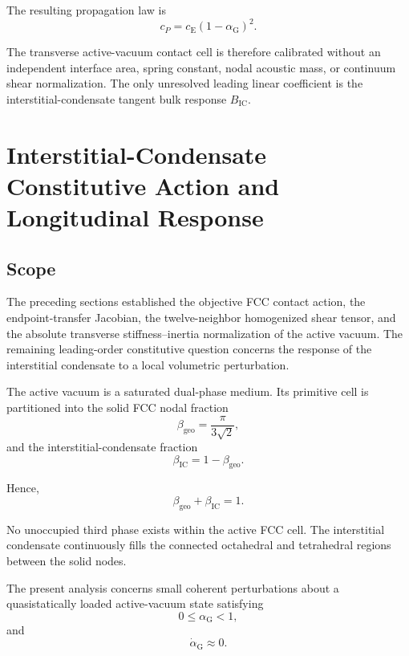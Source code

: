 The resulting propagation law is
\begin{equation}
    \boxed{ c_P = c_{\mathrm{E}} \left( 1-\alpha_{\mathrm{G}} \right)^2 }.
\end{equation}

The transverse active-vacuum contact cell is therefore calibrated without an independent interface area, spring constant, nodal acoustic mass, or continuum shear normalization. The only unresolved leading linear coefficient is the interstitial-condensate tangent bulk response $B_{\mathrm{IC}}$.

\section{Interstitial-Condensate Constitutive Action and Longitudinal Response}

\subsection{Scope}

The preceding sections established the objective FCC contact action, the endpoint-transfer Jacobian, the twelve-neighbor homogenized shear tensor, and the absolute transverse stiffness--inertia normalization of the active vacuum. The remaining leading-order constitutive question concerns the response of the interstitial condensate to a local volumetric perturbation.

The active vacuum is a saturated dual-phase medium. Its primitive cell is partitioned into the solid FCC nodal fraction
\begin{equation}
    \beta_{\mathrm{geo}} = \frac{\pi}{3\sqrt{2}},
\end{equation}
and the interstitial-condensate fraction
\begin{equation}
    \beta_{\mathrm{IC}} = 1 - \beta_{\mathrm{geo}}.
\end{equation}

Hence,
\begin{equation}
    \boxed{ \beta_{\mathrm{geo}} + \beta_{\mathrm{IC}} = 1 }.
\end{equation}

No unoccupied third phase exists within the active FCC cell. The interstitial condensate continuously fills the connected octahedral and tetrahedral regions between the solid nodes.

The present analysis concerns small coherent perturbations about a quasistatically loaded active-vacuum state satisfying
\begin{equation}
    0 \leq \alpha_{\mathrm{G}} < 1,
\end{equation}
and
\begin{equation}
    \dot{\alpha}_{\mathrm{G}} \approx 0.
\end{equation}

